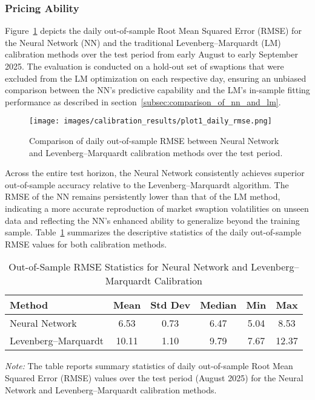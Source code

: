 \subsubsection{Pricing Ability}
Figure~\ref{fig:daily_rmse_comparison} depicts the daily out-of-sample Root Mean Squared Error (RMSE) for the Neural Network (NN) and the traditional Levenberg–Marquardt (LM) calibration methods over the test period from early August to early September 2025. The evaluation is conducted on a hold-out set of swaptions that were excluded from the LM optimization on each respective day, ensuring an unbiased comparison between the NN’s predictive capability and the LM’s in-sample fitting performance as described in section~\ref{subsec:comparison_of_nn_and_lm}.

\begin{figure}[H]
	\centering
	\texttt{[image: images/calibration\_results/plot1\_daily\_rmse.png]}
	\caption{Comparison of daily out-of-sample RMSE between Neural Network and Levenberg–Marquardt calibration methods over the test period.}
	\label{fig:daily_rmse_comparison}
\end{figure}

Across the entire test horizon, the Neural Network consistently achieves superior out-of-sample accuracy relative to the Levenberg–Marquardt algorithm. The RMSE of the NN remains persistently lower than that of the LM method, indicating a more accurate reproduction of market swaption volatilities on unseen data and reflecting the NN’s enhanced ability to generalize beyond the training sample. Table~\ref{tab:rmse_statistics} summarizes the descriptive statistics of the daily out-of-sample RMSE values for both calibration methods.

\begin{table}[htbp]
	\centering
	\begin{threeparttable}
		\caption{Out-of-Sample RMSE Statistics for Neural Network and Levenberg--Marquardt Calibration}
		\label{tab:rmse_statistics}
		\begin{tabular}{lccccc}
			\toprule
			\textbf{Method}      & \textbf{Mean} & \textbf{Std Dev} & \textbf{Median} & \textbf{Min} & \textbf{Max} \\
			\midrule
			Neural Network       & 6.53          & 0.73             & 6.47            & 5.04         & 8.53         \\
			Levenberg--Marquardt & 10.11         & 1.10             & 9.79            & 7.67         & 12.37        \\
			\bottomrule
		\end{tabular}
		\begin{tablenotes}
			\footnotesize
			\item \textit{Note:} The table reports summary statistics of daily out-of-sample Root Mean Squared Error (RMSE) values over the test period (August 2025) for the Neural Network and Levenberg--Marquardt calibration methods.
		\end{tablenotes}
	\end{threeparttable}
\end{table}

